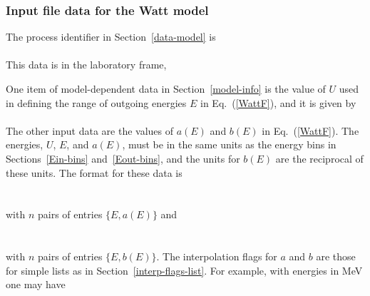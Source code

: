 \subsubsection{Input file data for the Watt model}
The process identifier in Section~\ref{data-model} is\\
  \\
This data is in the laboratory frame,\\

One item of model-dependent data in Section~\ref{model-info}
is the value of $U$ used in defining the range of outgoing
energies $E$ in Eq.~(\ref{WattF}), and it is given by\\
  \\
The other input data are the values of $a(E)$ and $b(E)$ in
Eq.~(\ref{WattF}).  
The energies, $U$, $E$, and $a(E)$, must be in the same
units as the energy bins in Sections~\ref{Ein-bins} and~\ref{Eout-bins},
and the units for $b(E)$ are the reciprocal of these units.
The format for these data is\\
  \\
  \\
with $n$ pairs of entries $\{E, a(E)\}$ and\\
  \\
  \\
with $n$ pairs of entries $\{E, b(E)\}$.
The interpolation flags for $a$ and $b$ are those for simple lists as in 
Section~\ref{interp-flags-list}.
For example, with energies in MeV  one may have\\
  \\
  \\
  \\
  \\
  \\
  \Input{}{ $\cdots$}\\
     \\
  \\
  \\
  \\
  \\
  \Input{}{ $\cdots$}\\

